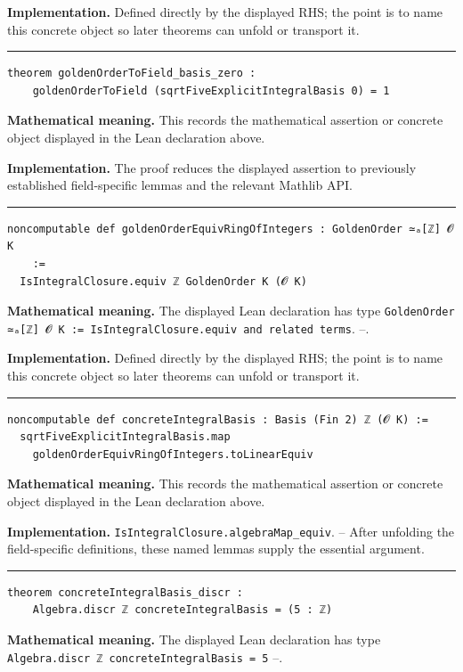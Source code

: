 \documentclass[UTF8,a4paper,11pt,fontset=fandol]{ctexart}
\theoremstyle{definition}
\newcommand{\statementsep}{\par\medskip\hrule\medskip}
\begin{document}
\noindent\textbf{Implementation.} Defined directly by the displayed RHS; the point is to name this concrete object so later theorems can unfold or transport it.\par
\statementsep
\begin{verbatim}
theorem goldenOrderToField_basis_zero :
    goldenOrderToField (sqrtFiveExplicitIntegralBasis 0) = 1
\end{verbatim}
\noindent\textbf{Mathematical meaning.} This records the mathematical assertion or concrete object displayed in the Lean declaration above.\par
\noindent\textbf{Implementation.} The proof reduces the displayed assertion to previously established field-specific lemmas and the relevant Mathlib API.\par
\statementsep
\begin{verbatim}
noncomputable def goldenOrderEquivRingOfIntegers : GoldenOrder ≃ₐ[ℤ] 𝓞 K
    :=
  IsIntegralClosure.equiv ℤ GoldenOrder K (𝓞 K)
\end{verbatim}
\noindent\textbf{Mathematical meaning.} The displayed Lean declaration has type \texttt{GoldenOrder ≃ₐ[ℤ] 𝓞 K := IsIntegralClosure.\allowbreak{}equiv and related terms}. --.\par
\noindent\textbf{Implementation.} Defined directly by the displayed RHS; the point is to name this concrete object so later theorems can unfold or transport it.\par
\statementsep
\begin{verbatim}
noncomputable def concreteIntegralBasis : Basis (Fin 2) ℤ (𝓞 K) :=
  sqrtFiveExplicitIntegralBasis.map
    goldenOrderEquivRingOfIntegers.toLinearEquiv
\end{verbatim}
\noindent\textbf{Mathematical meaning.} This records the mathematical assertion or concrete object displayed in the Lean declaration above.\par
\noindent\textbf{Implementation.} \texttt{IsIntegralClosure.\allowbreak{}algebraMap\_\allowbreak{}equiv}. -- After unfolding the field-specific definitions, these named lemmas supply the essential argument.\par
\statementsep
\begin{verbatim}
theorem concreteIntegralBasis_discr :
    Algebra.discr ℤ concreteIntegralBasis = (5 : ℤ)
\end{verbatim}
\noindent\textbf{Mathematical meaning.} The displayed Lean declaration has type \texttt{Algebra.\allowbreak{}discr ℤ concreteIntegralBasis = 5} --.\par
\end{document}
